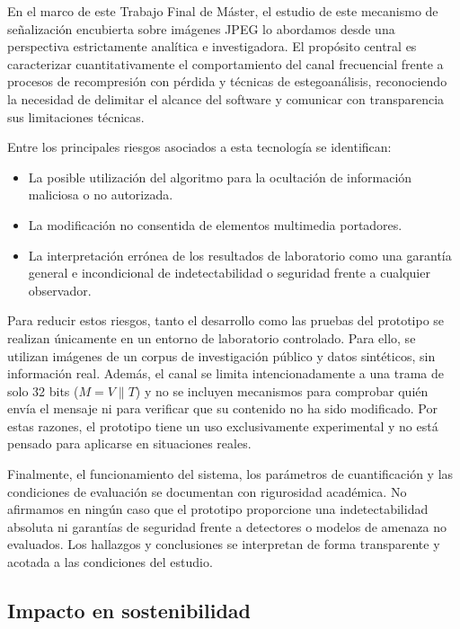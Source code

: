 \documentclass[IB]{TFUOC}%
\begin{document}
En el marco de este Trabajo Final de Máster, el estudio de este mecanismo de señalización encubierta sobre imágenes JPEG lo abordamos desde una perspectiva estrictamente analítica e investigadora. El propósito central es caracterizar cuantitativamente el comportamiento del canal frecuencial frente a procesos de recompresión con pérdida y técnicas de estegoanálisis, reconociendo la necesidad de delimitar el alcance del software y comunicar con transparencia sus limitaciones técnicas.

Entre los principales riesgos asociados a esta tecnología se identifican:
\begin{itemize}
    \item La posible utilización del algoritmo para la ocultación de información maliciosa o no autorizada.
    \item La modificación no consentida de elementos multimedia portadores.
    \item La interpretación errónea de los resultados de laboratorio como una garantía general e incondicional de indetectabilidad o seguridad frente a cualquier observador.
\end{itemize}

Para reducir estos riesgos, tanto el desarrollo como las pruebas del prototipo se realizan únicamente en un entorno de laboratorio controlado. Para ello, se utilizan imágenes de un corpus de investigación público y datos sintéticos, sin información real. Además, el canal se limita intencionadamente a una trama de solo 32 bits ($M = V \parallel T$) y no se incluyen mecanismos para comprobar quién envía el mensaje ni para verificar que su contenido no ha sido modificado. Por estas razones, el prototipo tiene un uso exclusivamente experimental y no está pensado para aplicarse en situaciones reales.

Finalmente, el funcionamiento del sistema, los parámetros de cuantificación y las condiciones de evaluación se documentan con rigurosidad académica. No afirmamos en ningún caso que el prototipo proporcione una indetectabilidad absoluta ni garantías de seguridad frente a detectores o modelos de amenaza no evaluados. Los hallazgos y conclusiones se interpretan de forma transparente y acotada a las condiciones del estudio.

\subsection{Impacto en sostenibilidad}
\label{subsec:impacto_sostenibilidad}
\end{document}

